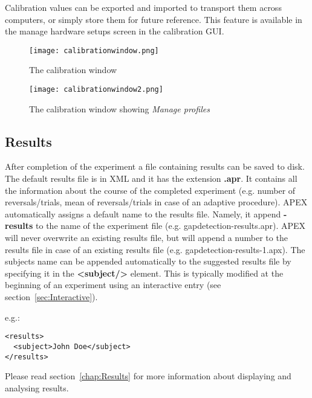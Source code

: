 Calibration values can be exported and imported to transport them across computers, or simply store them for future reference. This feature is available in the manage hardware setups screen in the calibration GUI.


\begin{figure}
 \centering
 \texttt{[image: calibrationwindow.png]}
 \caption{The calibration window}
 \label{fig:calibration}
\end{figure}


\begin{figure}
 \centering
\texttt{[image: calibrationwindow2.png]}
 \caption{The calibration window showing \emph{Manage profiles}}
 \label{fig:calibrationprofiles}
\end{figure}
\label{sec:Calibration}




\subsection{Results}
\label{sec:Results}



After completion of the experiment a file containing results can be saved to disk. The default results file is in XML and it has the extension \textbf{.apr}. It contains all the
information about the course of the completed experiment (e.g. number of reversals/trials, mean of reversals/trials in case of an adaptive procedure).
APEX automatically assigns a default name to the results file. Namely, it append \textbf{-results }to the name of the experiment file (e.g. gapdetection-results.apr). APEX will never overwrite an existing results file, but will append a number to the results file in case of an existing results file (e.g. gapdetection-results-1.apx). The subjects name can be appended automatically to the suggested results file by specifying it in the \textbf{<subject/>} element. This is typically modified at the beginning of an experiment using an interactive entry (see section~\ref{sec:Interactive}).

e.g.:

\begin{lstlisting}
<results>
  <subject>John Doe</subject>
</results>
\end{lstlisting}

Please read section~\ref{chap:Results} for more information about displaying and analysing results.

